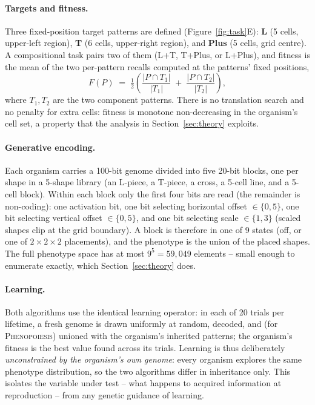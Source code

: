 \documentclass[11pt]{article}
\newcommand{\Pheno}{\textsc{Phenopoiesis}}
\begin{document}
\paragraph{Targets and fitness.}
Three fixed-position target patterns are defined
(Figure~\ref{fig:task}E): \textbf{L} (5 cells, upper-left region), \textbf{T}
(6 cells, upper-right region), and \textbf{Plus} (5 cells, grid centre). A
compositional task pairs two of them (L+T, T+Plus, or L+Plus), and fitness is
the mean of the two per-pattern recalls computed at the patterns' fixed
positions,
\begin{equation}
F(P) \;=\; \tfrac{1}{2}\left(
\frac{|P \cap T_1|}{|T_1|} \;+\; \frac{|P \cap T_2|}{|T_2|} \right),
\label{eq:comp-fitness}
\end{equation}
where $T_1, T_2$ are the two component patterns. There is no translation
search and no penalty for extra cells: fitness is monotone non-decreasing in
the organism's cell set, a property that the analysis in
Section~\ref{sec:theory} exploits.

\paragraph{Generative encoding.}
Each organism carries a 100-bit genome divided into five 20-bit blocks, one
per shape in a 5-shape library (an L-piece, a T-piece, a cross, a 5-cell
line, and a 5-cell block). Within each block only the first four bits are
read (the remainder is non-coding): one activation bit, one bit selecting
horizontal offset $\in \{0, 5\}$, one bit selecting vertical offset
$\in \{0, 5\}$, and one bit selecting scale $\in \{1, 3\}$ (scaled shapes
clip at the grid boundary). A block is therefore in one of 9 states (off, or
one of $2 \times 2 \times 2$ placements), and the phenotype is the union of
the placed shapes. The full phenotype space has at most $9^5 = 59{,}049$
elements -- small enough to enumerate exactly, which
Section~\ref{sec:theory} does.

\paragraph{Learning.}
Both algorithms use the identical learning operator: in each of 20 trials per
lifetime, a fresh genome is drawn uniformly at random, decoded, and (for
\Pheno{}) unioned with the organism's inherited patterns; the organism's
fitness is the best value found across its trials. Learning is thus
deliberately \emph{unconstrained by the organism's own genome}: every
organism explores the same phenotype distribution, so the two algorithms
differ in inheritance only. This isolates the variable under test -- what
happens to acquired information at reproduction -- from any genetic guidance
of learning.
\end{document}
